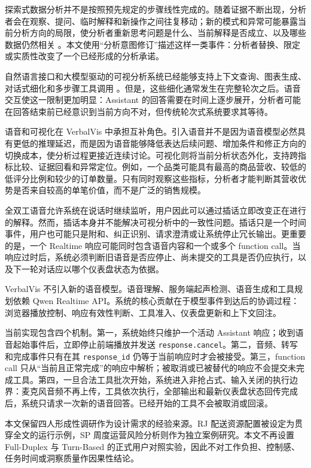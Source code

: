 \documentclass[UTF8,a4paper,10.5pt]{ctexart}
\begin{document}
探索式数据分析并不是按照预先规定的步骤线性完成的。随着证据不断出现，分析者会在观察、提问、临时解释和新操作之间往复移动；新的模式和异常可能暴露当前分析方向的局限，使分析者重新思考问题是什么、当前解释是否成立、以及哪些数据仍然相关 \cite{russell1993cost,pirolli2005sensemaking,sacha2014knowledge,battle2019characterizing}。本文使用“分析意图修订”描述这样一类事件：分析者替换、限定或实质性改变了一个已经形成的分析承诺。

自然语言接口和大模型驱动的可视分析系统已经能够支持上下文查询、图表生成、对话式细化和多步骤工具调用 \cite{gao2015datatone,setlur2016eviza,narechania2021nl4dv,dibia2023lida,wang2024dataformulator2,zhao2024lightva}。但是，这些细化通常发生在完整轮次之后。语音交互使这一限制更加明显：Assistant 的回答需要在时间上逐步展开，分析者可能在回答结束前已经意识到当前方向不对，但传统轮次式系统要求其等待。

语音和可视化在 VerbalVis 中承担互补角色。引入语音并不是因为语音模型必然具有更低的推理延迟，而是因为语音能够降低表达后续问题、增加条件和修正方向的切换成本，使分析过程更接近连续讨论。可视化则将当前分析状态外化，支持跨指标比较、证据回看和异常定位。例如，一个品类可能具有最高的商品营收、较低的低评分比例和较少的订单数量。只有同时观察这些指标，分析者才能判断其营收优势是否来自较高的单笔价值，而不是广泛的销售规模。

全双工语音允许系统在说话时继续监听，用户因此可以通过插话立即改变正在进行的解释。然而，插话本身并不能解决可视分析中的一致性问题。插话只是一个时间事件，用户也可能只是附和、纠正识别、请求澄清或让系统停止冗长输出。更重要的是，一个 Realtime 响应可能同时包含语音内容和一个或多个 function call。当响应过时后，系统必须判断旧语音是否应停止、尚未提交的工具是否仍应执行，以及下一轮对话应以哪个仪表盘状态为依据。

VerbalVis 不引入新的语音模型。语音理解、服务端起声检测、语音生成和工具规划依赖 Qwen Realtime API。系统的核心贡献在于模型事件到达后的协调过程：浏览器播放控制、响应有效性判断、工具准入、仪表盘更新和上下文回注。

当前实现包含四个机制。第一，系统始终只维护一个活动 Assistant 响应；收到语音起始事件后，立即停止前端播放并发送 \texttt{response.cancel}。第二，音频、转写和完成事件只有在其 \texttt{response\_id} 仍等于当前响应时才会被接受。第三，function call 只从“当前且正常完成”的响应中解析；被取消或已被替代的响应不会提交未完成工具。第四，一旦合法工具批次开始，系统进入非抢占式、输入关闭的执行边界：麦克风音频不再上传，工具依次执行，全部输出和最新仪表盘状态回传完成后，系统只请求一次新的语音回答。已经开始的工具不会被取消或回滚。

本文保留四人形成性调研作为设计需求的经验来源。RJ 配送资源配置被设定为贯穿全文的运行示例，SP 周度运营风险分析则作为独立案例研究。本文不再设置 Full-Duplex 与 Turn-Based 的正式用户对照实验，因此不对工作负担、控制感、任务时间或洞察质量作因果性结论。
\end{document}
